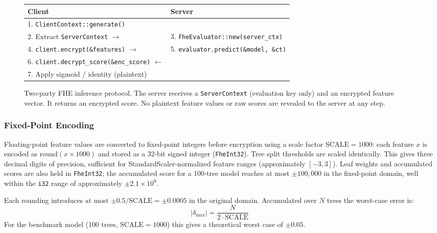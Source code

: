 \documentclass[12pt]{article}
\begin{document}
\begin{figure}[h]
\centering
\small\ttfamily
\begin{tabular}{p{7.2cm} p{5.5cm}}
\textbf{Client} & \textbf{Server} \\
\hline
1. \texttt{ClientContext::generate()} & \\
2. Extract \texttt{ServerContext} $\longrightarrow$ & 3. \texttt{FheEvaluator::new(server\_ctx)} \\
4. \texttt{client.encrypt(\&features)} $\longrightarrow$ & 5. \texttt{evaluator.predict(\&model, \&ct)} \\
6. \texttt{client.decrypt\_score(\&enc\_score)} $\longleftarrow$ & \\
7. Apply sigmoid / identity (plaintext) & \\
\end{tabular}
\caption{Two-party FHE inference protocol. The server receives a \texttt{ServerContext} (evaluation key only) and an encrypted feature vector. It returns an encrypted score. No plaintext feature values or raw scores are revealed to the server at any step.}
\label{fig:protocol}
\end{figure}

\subsubsection*{Fixed-Point Encoding}

Floating-point feature values are converted to fixed-point integers before encryption using a scale factor $\text{SCALE} = 1000$: each feature $x$ is encoded as $\text{round}(x \times 1000)$ and stored as a 32-bit signed integer (\texttt{FheInt32}). Tree split thresholds are scaled identically. This gives three decimal digits of precision, sufficient for StandardScaler-normalized feature ranges (approximately $[-3, 3]$). Leaf weights and accumulated scores are also held in \texttt{FheInt32}; the accumulated score for a 100-tree model reaches at most $\pm 100{,}000$ in the fixed-point domain, well within the \texttt{i32} range of approximately $\pm 2.1 \times 10^9$.

Each rounding introduces at most $\pm 0.5 / \text{SCALE} = \pm 0.0005$ in the original domain. Accumulated over $N$ trees the worst-case error is:
%
\begin{equation}
|\delta_{\max}| = \frac{N}{2 \cdot \text{SCALE}}
\end{equation}
%
For the benchmark model (100 trees, $\text{SCALE} = 1000$) this gives a theoretical worst case of $\pm 0.05$.
\end{document}
